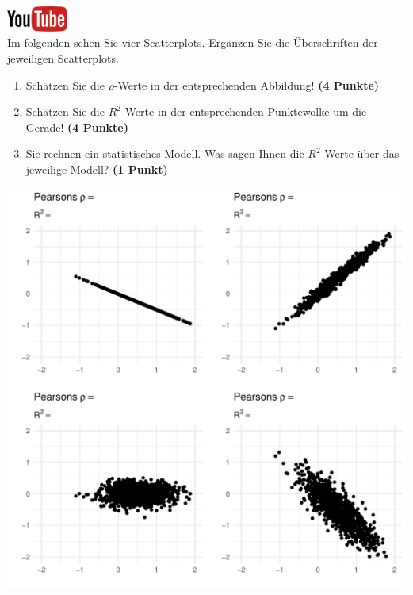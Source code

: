 \documentclass[a4paper, 10pt]{scrartcl}\usepackage[]{graphicx}\usepackage[]{xcolor}
\makeatletter
\def\maxwidth{ %
  \ifdim\Gin@nat@width>\linewidth
    \linewidth
  \else
    \Gin@nat@width
  \fi
}
\makeatother
\begin{document}
\hfill\href{https://youtu.be/2QJa19ZwLls}{\includegraphics[width =
  2cm]{img/youtube}}\\[1Ex]

Im folgenden sehen Sie vier Scatterplots. Erg{\"a}nzen Sie die {\"U}berschriften
der jeweiligen Scatterplots.


\begin{enumerate}
\item Sch{\"a}tzen Sie die $\rho$-Werte in der entsprechenden
  Abbildung! \textbf{(4 Punkte)}
\item Sch{\"a}tzen Sie die $R^2$-Werte in der entsprechenden
  Punktewolke um die Gerade! \textbf{(4 Punkte)}
\item Sie rechnen ein statistisches Modell. Was sagen Ihnen die $R^2$-Werte
  {\"u}ber das jeweilige Modell? \textbf{(1 Punkt)}
\end{enumerate}




{\centering \includegraphics[width=\maxwidth]{img/correlation-02-1} 

}
\end{document}
